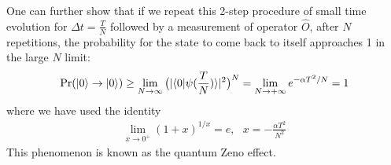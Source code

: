 One can further show that if we repeat this 2-step procedure of small time evolution for $\Delta t=\frac TN$ followed by a measurement of operator $\hat O$, after $N$ repetitions, the probability for the state to come back to itself approaches 1 in the large $N$ limit:
\begin{align}
    \text{Pr}(|{0}\rangle\rightarrow|{0}\rangle)\geq\lim_{N\rightarrow\infty}\big(|\langle{0|\psi(\frac TN)}\rangle|^2\big)^N=\lim_{N\rightarrow+\infty}e^{-\alpha T^2/N}=1
\end{align}
where we have used the identity
\begin{align}
    \lim_{x\rightarrow0^+}(1+x)^{1/x}=e,~~~x=-\frac{\alpha T^2}{N^2}
\end{align}
This phenomenon is known as the quantum Zeno effect. 